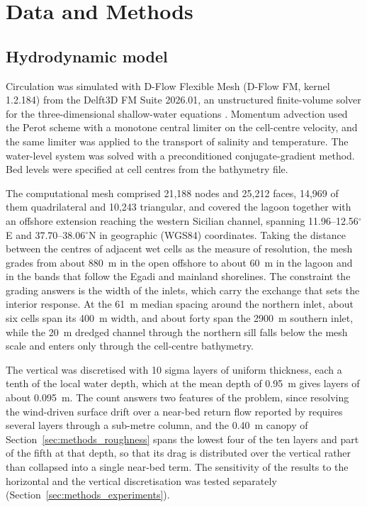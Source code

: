 \section{Data and Methods}
\label{sec:data_methods}

\subsection{Hydrodynamic model}
\label{sec:methods_model}

Circulation was simulated with D-Flow Flexible Mesh (D-Flow FM, kernel
1.2.184) from the Delft3D FM Suite 2026.01, an unstructured finite-volume
solver for the three-dimensional shallow-water equations \citep{Kernkamp2011}.
Momentum advection used the Perot scheme with a monotone central limiter on
the cell-centre velocity, and the same limiter was applied to the transport of
salinity and temperature. The water-level system was solved with a
preconditioned conjugate-gradient method. Bed levels were specified at cell
centres from the bathymetry file.

The computational mesh comprised 21{,}188 nodes and 25{,}212 faces, 14{,}969
of them quadrilateral and 10{,}243 triangular, and covered the lagoon
together with an offshore extension reaching the
western Sicilian channel, spanning 11.96--12.56$^\circ$E and
37.70--38.06$^\circ$N in geographic (WGS84) coordinates. Taking the distance
between the centres of adjacent wet cells as the measure of resolution, the
mesh grades from about 880~m in the open offshore to about 60~m in the lagoon
and in the bands that follow the Egadi and mainland shorelines. The constraint
the grading answers is the width of the inlets, which carry the exchange that
sets the interior response. At the 61~m median spacing around the northern
inlet, about six cells span its 400~m width, and about forty span the 2900~m
southern inlet, while the 20~m dredged channel through the northern sill falls
below the mesh scale and enters only through the cell-centre bathymetry.

The vertical was discretised with 10 sigma layers of uniform thickness, each a
tenth of the local water depth, which at the mean depth of 0.95~m gives layers
of about 0.095~m. The count answers two features of the problem, since
resolving the wind-driven surface drift over a near-bed return flow reported
by \citet{DeMarchis2012} requires several layers through a sub-metre column,
and the 0.40~m canopy of Section~\ref{sec:methods_roughness} spans the lowest
four of the ten layers and part of the fifth at that depth, so that its drag
is distributed over the vertical rather than collapsed into a single near-bed
term. The sensitivity of the results to the horizontal and the vertical
discretisation was tested separately (Section~\ref{sec:methods_experiments}).

